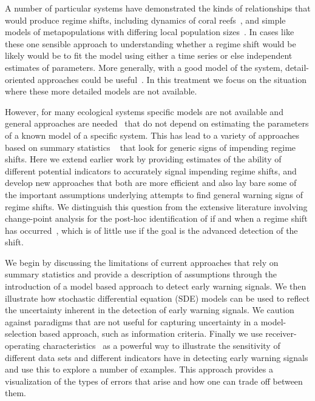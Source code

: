 \documentclass[authoryear,review,11pt]{elsarticle}
\begin{document}
A number of particular systems have demonstrated the kinds of relationships that would produce regime shifts,
including dynamics of coral reefs~\citep{Mumby2007},
and simple models of metapopulations with differing local population sizes~\citep{Hastings1991a}.
In cases like these one sensible approach to understanding 
whether a regime shift would be likely would be 
to fit the model using either a time series or else independent estimates of parameters. 
More generally, with a good model of the system, detail-oriented approaches could be useful~\citep{Lade2012}.  
In this treatment we focus on the situation where these more detailed models are not available.  

However, for many ecological systems specific models are not available and general approaches are needed~\citep{Scheffer2009, Lade2012}
that do not depend on estimating the parameters of a known model of a specific system. 
This has lead to a variety of approaches based on summary statistics
~\citep[\emph{e.g.}][]{Carpenter2006, Held2004, Dakos2008, Guttal2008, Biggs2009, Carpenter2011, Seekell2011}
that look for generic signs of impending regime shifts.  
Here we extend earlier work by providing estimates 
of the ability of different potential indicators to accurately signal impending regime shifts,
and develop new approaches that both are more efficient
and also lay bare some of the important assumptions underlying attempts 
to find general warning signs of regime shifts.  
We distinguish this question from the extensive literature involving change-point analysis 
for the post-hoc identification of if and when a regime shift has occurred~\citep{Easterling1995, Rodinonv2004, Lenton2009}, 
which is of little use if the goal is the advanced detection of the shift.  


We begin by discussing the limitations of current approaches that rely on summary statistics
and provide a description of assumptions through the introduction of a model based approach to detect early warning signals.
We then illustrate how stochastic differential equation (SDE) models can be used
to reflect the uncertainty inherent in the detection of early warning signals. 
We caution against paradigms that are not useful for capturing uncertainty in
a model-selection based approach, such as information criteria.
Finally we use receiver-operating characteristics~\citep{Green1989, Keller2009}
as a powerful way to illustrate the sensitivity of different data sets
and different indicators have in detecting early warning signals and use this to explore a number of examples.
This approach provides a visualization of the types of errors that arise and how one can trade off between them.  
\end{document}
